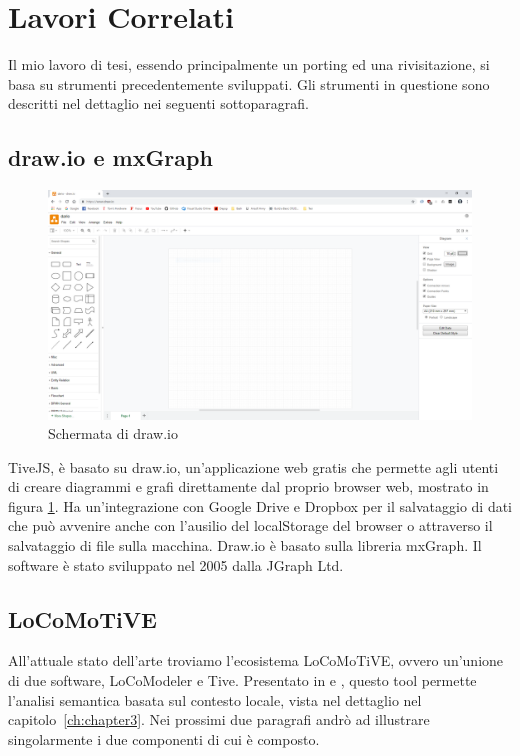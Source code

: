    \section{Lavori Correlati}
        Il mio lavoro di tesi, essendo principalmente un porting ed una rivisitazione, si basa su strumenti precedentemente sviluppati.
        Gli strumenti in questione sono descritti nel dettaglio nei seguenti sottoparagrafi.

        \subsection{draw.io e mxGraph}

        \begin{figure}[htbp]
            \centering
            \includegraphics[scale=0.17]{Figure/drawio.png}
            \caption{Schermata di draw.io}
            \label{fig:drawio}
        \end{figure}

            TiveJS, è basato su draw.io, un'applicazione web gratis che permette agli utenti di creare diagrammi e grafi direttamente dal proprio browser web, mostrato in figura \ref{fig:drawio}. Ha un'integrazione con Google Drive e Dropbox per il salvataggio di dati che può avvenire anche con l'ausilio del localStorage del browser o attraverso il salvataggio di file sulla macchina. Draw.io è basato sulla libreria mxGraph.
            \newline
            Il software è stato sviluppato nel 2005 dalla JGraph Ltd.

        \subsection{LoCoMoTiVE}
            
            All'attuale stato dell'arte troviamo l'ecosistema LoCoMoTiVE, ovvero un'unione di due software, LoCoModeler e Tive. Presentato in \cite{extending_localcontext} e \cite{localcontext}, questo tool permette l'analisi semantica basata sul contesto locale, vista nel dettaglio nel capitolo~\ref{ch:chapter3}. Nei prossimi due paragrafi andrò ad illustrare singolarmente i due componenti di cui è composto.

